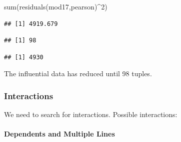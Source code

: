 \documentclass[
  twoside]{article}
\newenvironment{Shaded}{\begin{snugshade}}{\end{snugshade}}
\newcommand{\ConstantTok}[1]{\textcolor[rgb]{0.00,0.00,0.00}{#1}}
\newcommand{\DecValTok}[1]{\textcolor[rgb]{0.00,0.00,0.81}{#1}}
\newcommand{\FunctionTok}[1]{\textcolor[rgb]{0.00,0.00,0.00}{#1}}
\newcommand{\NormalTok}[1]{#1}
\newcommand{\OtherTok}[1]{\textcolor[rgb]{0.56,0.35,0.01}{#1}}
\newcommand{\SpecialCharTok}[1]{\textcolor[rgb]{0.00,0.00,0.00}{#1}}
\newcommand{\StringTok}[1]{\textcolor[rgb]{0.31,0.60,0.02}{#1}}
\begin{document}
\begin{Shaded}
\begin{Highlighting}[]
\FunctionTok{sum}\NormalTok{(}\FunctionTok{residuals}\NormalTok{(mod17,}\StringTok{\textquotesingle{}pearson\textquotesingle{}}\NormalTok{)}\SpecialCharTok{\^{}}\DecValTok{2}\NormalTok{)}
\end{Highlighting}
\end{Shaded}

\begin{verbatim}
## [1] 4919.679
\end{verbatim}

\begin{Shaded}
\end{Shaded}

\begin{verbatim}
## [1] 98
\end{verbatim}

\begin{Shaded}
\end{Shaded}

\begin{verbatim}
## [1] 4930
\end{verbatim}

The influential data has reduced until 98 tuples.

\hypertarget{interactions}{%
\subsubsection{Interactions}\label{interactions}}

We need to search for interactions. Possible interactions:

\hypertarget{dependents-and-multiple-lines}{%
\paragraph{Dependents and Multiple
Lines}\label{dependents-and-multiple-lines}}
\end{document}
